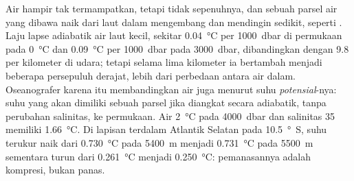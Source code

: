 Air hampir tak termampatkan, tetapi tidak sepenuhnya, dan sebuah parsel air yang dibawa naik dari laut dalam mengembang dan mendingin sedikit, seperti . Laju lapse adiabatik air laut kecil, sekitar \qty{0.04}{\celsius} per \qty{1000}{dbar} di permukaan pada \qty{0}{\celsius} dan \qty{0.09}{\celsius} per \qty{1000}{dbar} pada \qty{3000}{dbar}, dibandingkan dengan \num{9.8} per kilometer di udara; tetapi selama lima kilometer ia bertambah menjadi beberapa persepuluh derajat, lebih dari perbedaan antara air dalam. Oseanografer karena itu membandingkan air juga menurut suhu \emph{potensial}-nya: suhu yang akan dimiliki sebuah parsel jika diangkat secara adiabatik, tanpa perubahan salinitas, ke permukaan. Air \qty{2}{\celsius} pada \qty{4000}{dbar} dan salinitas 35 memiliki  \qty{1.66}{\celsius}. Di lapisan terdalam Atlantik Selatan pada \qty{10.5}{\degree S}, suhu terukur naik dari \qty{0.730}{\celsius} pada \qty{5400}{m} menjadi \qty{0.731}{\celsius} pada \qty{5500}{m} sementara  turun dari \qty{0.261}{\celsius} menjadi \qty{0.250}{\celsius}: pemanasannya adalah kompresi, bukan panas.

